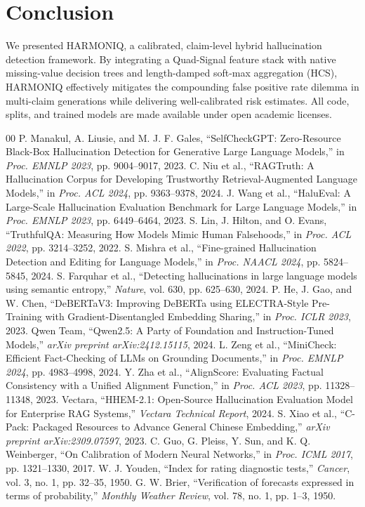 \documentclass[conference]{IEEEtran}
\begin{document}
\section{Conclusion}
We presented HARMONIQ, a calibrated, claim-level hybrid hallucination detection framework. 
By integrating a Quad-Signal feature stack with native missing-value decision trees and length-damped soft-max aggregation (HCS), HARMONIQ effectively mitigates the compounding false positive rate dilemma in multi-claim generations while delivering well-calibrated risk estimates. 
All code, splits, and trained models are made available under open academic licenses.

\begin{thebibliography}{00}
 P. Manakul, A. Liusie, and M. J. F. Gales, ``SelfCheckGPT: Zero-Resource Black-Box Hallucination Detection for Generative Large Language Models,'' in \textit{Proc. EMNLP 2023}, pp. 9004--9017, 2023.
 C. Niu et al., ``RAGTruth: A Hallucination Corpus for Developing Trustworthy Retrieval-Augmented Language Models,'' in \textit{Proc. ACL 2024}, pp. 9363--9378, 2024.
 J. Wang et al., ``HaluEval: A Large-Scale Hallucination Evaluation Benchmark for Large Language Models,'' in \textit{Proc. EMNLP 2023}, pp. 6449--6464, 2023.
 S. Lin, J. Hilton, and O. Evans, ``TruthfulQA: Measuring How Models Mimic Human Falsehoods,'' in \textit{Proc. ACL 2022}, pp. 3214--3252, 2022.
 S. Mishra et al., ``Fine-grained Hallucination Detection and Editing for Language Models,'' in \textit{Proc. NAACL 2024}, pp. 5824--5845, 2024.
 S. Farquhar et al., ``Detecting hallucinations in large language models using semantic entropy,'' \textit{Nature}, vol. 630, pp. 625--630, 2024.
 P. He, J. Gao, and W. Chen, ``DeBERTaV3: Improving DeBERTa using ELECTRA-Style Pre-Training with Gradient-Disentangled Embedding Sharing,'' in \textit{Proc. ICLR 2023}, 2023.
 Qwen Team, ``Qwen2.5: A Party of Foundation and Instruction-Tuned Models,'' \textit{arXiv preprint arXiv:2412.15115}, 2024.
 L. Zeng et al., ``MiniCheck: Efficient Fact-Checking of LLMs on Grounding Documents,'' in \textit{Proc. EMNLP 2024}, pp. 4983--4998, 2024.
 Y. Zha et al., ``AlignScore: Evaluating Factual Consistency with a Unified Alignment Function,'' in \textit{Proc. ACL 2023}, pp. 11328--11348, 2023.
 Vectara, ``HHEM-2.1: Open-Source Hallucination Evaluation Model for Enterprise RAG Systems,'' \textit{Vectara Technical Report}, 2024.
 S. Xiao et al., ``C-Pack: Packaged Resources to Advance General Chinese Embedding,'' \textit{arXiv preprint arXiv:2309.07597}, 2023.
 C. Guo, G. Pleiss, Y. Sun, and K. Q. Weinberger, ``On Calibration of Modern Neural Networks,'' in \textit{Proc. ICML 2017}, pp. 1321--1330, 2017.
 W. J. Youden, ``Index for rating diagnostic tests,'' \textit{Cancer}, vol. 3, no. 1, pp. 32--35, 1950.
 G. W. Brier, ``Verification of forecasts expressed in terms of probability,'' \textit{Monthly Weather Review}, vol. 78, no. 1, pp. 1--3, 1950.
\end{thebibliography}
\end{document}
